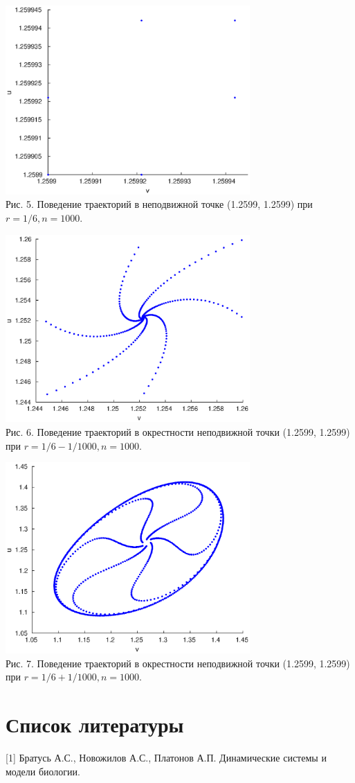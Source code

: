 \documentclass[11pt]{article}
\begin{document}
 	\begin{center}
 		\includegraphics[width=0.7\textwidth]{bifur_ns.eps}\\
 		{Рис. 5. Поведение траекторий в неподвижной точке (1.2599, 1.2599) при $r = 1/6, n = 1000.$}
 	\end{center}
 	\newpage
 	\begin{center}
 		\includegraphics[width=0.7\textwidth]{bifur_ns_1.eps}\\
 		{Рис. 6. Поведение траекторий в окрестности неподвижной точки (1.2599, 1.2599) при $r = 1/6 - 1/1000, n = 1000$.}
 	\end{center}
 	\begin{center}
 		\includegraphics[width=0.7\textwidth]{bifur_ns_2.eps}\\
 		{Рис. 7. Поведение траекторий в окрестности неподвижной точки (1.2599, 1.2599) при $r = 1/6 + 1/1000, n = 1000$.}
 	\end{center}
 	\newpage
 	{\section{Список литературы}}
 	{\hspace*{-0.6cm}[1] Братусь А.С., Новожилов А.С., Платонов А.П. Динамические системы и модели биологии. }
 	
\end{document}
